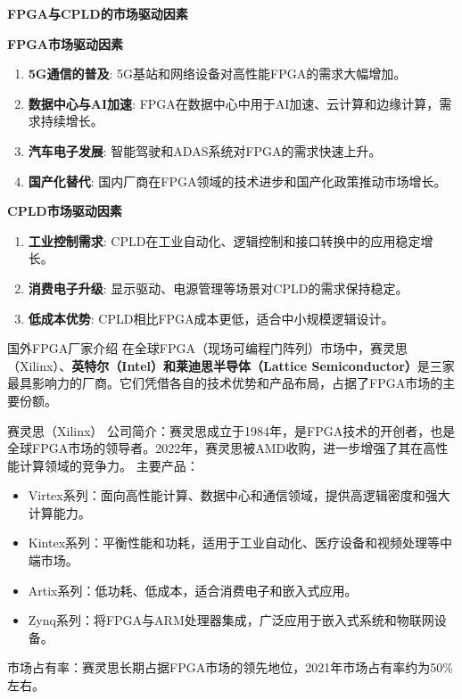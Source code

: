 \documentclass{beamer}
\providecommand{\tightlist}{%
  \setlength{\itemsep}{0pt}\setlength{\parskip}{0pt}}
\begin{document}
\begin{frame}[allowframebreaks]{\textbf{FPGA与CPLD的市场驱动因素}}
\begin{block}{\textbf{FPGA市场驱动因素}}
\begin{enumerate}
\tightlist
\item
    \textbf{5G通信的普及}: 5G基站和网络设备对高性能FPGA的需求大幅增加。\\
\item
    \textbf{数据中心与AI加速}:
    FPGA在数据中心中用于AI加速、云计算和边缘计算，需求持续增长。\\
\item
    \textbf{汽车电子发展}: 智能驾驶和ADAS系统对FPGA的需求快速上升。\\
\item
    \textbf{国产化替代}:
    国内厂商在FPGA领域的技术进步和国产化政策推动市场增长。
\end{enumerate}
\end{block}
\pagebreak
\begin{block}{\textbf{CPLD市场驱动因素}}
\begin{enumerate}
\tightlist
\item
    \textbf{工业控制需求}:
    CPLD在工业自动化、逻辑控制和接口转换中的应用稳定增长。\\
\item
    \textbf{消费电子升级}:
    显示驱动、电源管理等场景对CPLD的需求保持稳定。\\
\item
    \textbf{低成本优势}: CPLD相比FPGA成本更低，适合中小规模逻辑设计。
\end{enumerate}
\end{block}
\end{frame}

\begin{frame}
\begin{block}{国外FPGA厂家介绍}
在全球FPGA（现场可编程门阵列）市场中，赛灵思（Xilinx）、\textbf{英特尔（Intel）和莱迪思半导体（Lattice
Semiconductor）}是三家最具影响力的厂商。它们凭借各自的技术优势和产品布局，占据了FPGA市场的主要份额。
\end{block}
\end{frame}

\begin{frame}{赛灵思（Xilinx）}
公司简介：赛灵思成立于1984年，是FPGA技术的开创者，也是全球FPGA市场的领导者。2022年，赛灵思被AMD收购，进一步增强了其在高性能计算领域的竞争力。
主要产品：

\begin{itemize}
\tightlist
\item
    Virtex系列：面向高性能计算、数据中心和通信领域，提供高逻辑密度和强大计算能力。
\item
    Kintex系列：平衡性能和功耗，适用于工业自动化、医疗设备和视频处理等中端市场。
\item
    Artix系列：低功耗、低成本，适合消费电子和嵌入式应用。
\item
    Zynq系列：将FPGA与ARM处理器集成，广泛应用于嵌入式系统和物联网设备。
\end{itemize}

市场占有率：赛灵思长期占据FPGA市场的领先地位，2021年市场占有率约为50\%左右。
\end{frame}
\end{document}
